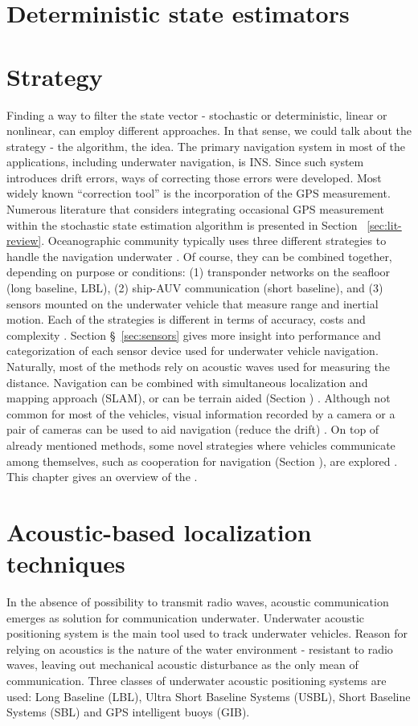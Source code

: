 \section{Deterministic state estimators}
\section{Strategy} 
Finding a way to filter the state vector - stochastic or deterministic, linear or nonlinear, can employ different approaches. In that sense, we could talk about the strategy - the algorithm, the idea. The primary navigation system in most of the applications, including underwater navigation, is INS. Since such system introduces drift errors, ways of correcting those errors were developed. Most widely known ``correction tool'' is the incorporation of the GPS measurement. Numerous literature that considers integrating occasional GPS measurement within the stochastic state estimation algorithm is presented in Section ~\ref{sec:lit-review}. Oceanographic community typically uses three different strategies to handle the navigation underwater \cite{whitcomb99}. Of course, they can be combined together, depending on purpose or conditions: (1) transponder networks on the seafloor (long baseline, LBL), (2) ship-AUV communication (short baseline), and (3) sensors mounted on the underwater vehicle that measure range and inertial motion. Each of the strategies is different in terms of accuracy, costs and complexity \cite{eustice05}. Section \S~\ref{sec:sensors} gives more insight into performance and categorization of each sensor device used for underwater vehicle navigation. Naturally, most of the methods rely on acoustic waves used for measuring the distance. Navigation can be combined with simultaneous localization and mapping approach (SLAM), or can be terrain aided (Section ) \cite{kinsey06}. Although not common for most of the vehicles, visual information recorded by a camera or a pair of cameras can be used to aid navigation (reduce the drift) \cite{eustice05large, bahr08}. On top of already mentioned methods, some novel strategies where vehicles communicate among themselves, such as cooperation for navigation (Section ), are explored \cite{bahr08}.  
This chapter gives an overview of the .       

\section{Acoustic-based localization techniques} \label{sec:acoustic}
In the absence of possibility to transmit radio waves, acoustic communication emerges as solution for communication underwater.
Underwater acoustic positioning system is the main tool used to track underwater vehicles. Reason for relying on acoustics is the nature of the water environment - resistant to radio waves, leaving out mechanical acoustic disturbance as the only mean of communication. Three classes of underwater acoustic positioning systems are used: Long Baseline (LBL), Ultra Short Baseline Systems (USBL), Short Baseline Systems (SBL) and GPS intelligent buoys (GIB). 

